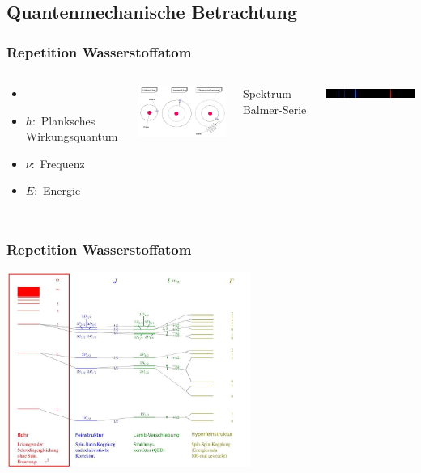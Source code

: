 
\subsection{Quantenmechanische Betrachtung}

\begin{frame}
  \frametitle{Repetition Wasserstoffatom}
	\begin{columns}
			 \begin{itemize} 
			\item[] 
			\item[]   $h:$ Planksches  Wirkungsquantum
		 	\item[]   $\nu:$ Frequenz
		 	\item[]   $E: $ Energie
		 	\end{itemize}		 			 	
		 	\includegraphics[width = 5cm]{./pictures/wasserstoffBohr}
		 	
			Spektrum Balmer-Serie
		 	
		 	\includegraphics[width = 5cm]{./pictures/wasserstoffSpektrum}
	
	\end{columns}

\end{frame}

\begin{frame}
	\frametitle {Repetition Wasserstoffatom}
	\begin{center}
		\includegraphics[width = 8cm]{./pictures/energieniveaus1}
	\end{center}

	
\end{frame}

